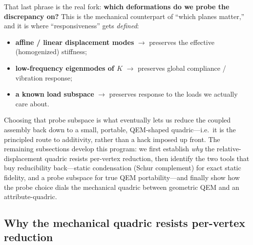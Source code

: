 That last phrase is the real fork: \textbf{which deformations do we probe the discrepancy on?}
This is the mechanical counterpart of ``which planes matter,'' and it is where ``responsiveness'' gets \emph{defined}:
\begin{itemize}
  \item \textbf{affine / linear displacement modes} $\rightarrow$ preserves the effective (homogenized) stiffness;
  \item \textbf{low-frequency eigenmodes of $K$} $\rightarrow$ preserves global compliance / vibration response;
  \item \textbf{a known load subspace} $\rightarrow$ preserves response to the loads we actually care about.
\end{itemize}
Choosing that probe subspace is what eventually lets us reduce the coupled assembly back down to a small, portable, QEM-shaped quadric---i.e.\ it is the principled route to additivity, rather than a hack imposed up front.
The remaining subsections develop this program: we first establish \emph{why} the relative-displacement quadric resists per-vertex reduction, then identify the two tools that buy reducibility back---static condensation (Schur complement) for exact static fidelity, and a probe subspace for true QEM portability---and finally show how the probe choice dials the mechanical quadric between geometric QEM and an attribute-quadric.

\subsection{Why the mechanical quadric resists per-vertex reduction}

